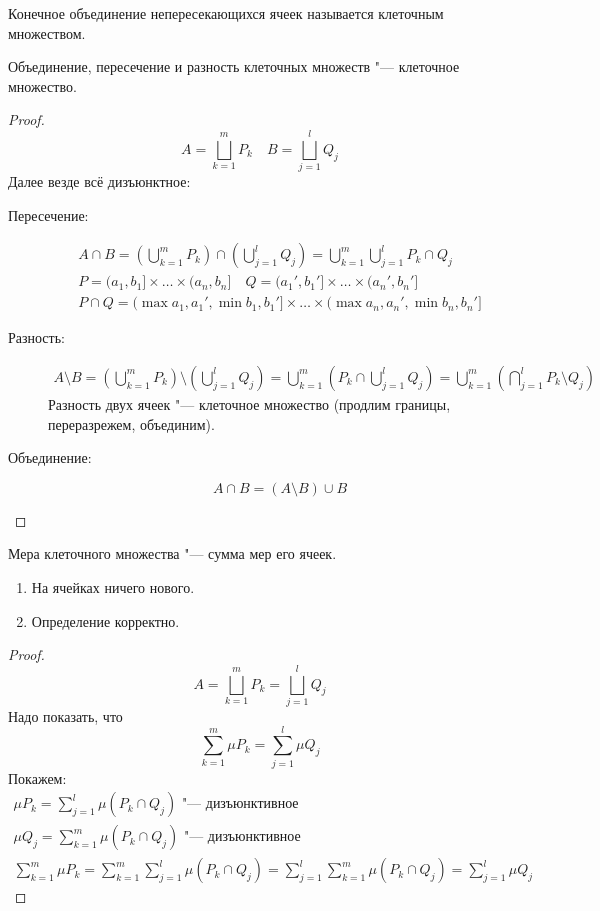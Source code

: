 \begin{Def}
	Конечное объединение непересекающихся ячеек называется клеточным множеством.
\end{Def}
\begin{lemma}
	Объединение, пересечение и разность клеточных множеств "--- клеточное множество.
\end{lemma}
\begin{proof}
	\[ A = \bigsqcup_{k=1}^m P_k \quad B = \bigsqcup_{j=1}^l Q_j \]
	Далее везде всё дизъюнктное:
	\begin{description}
	\item[Пересечение:]
		\begin{gather*}
			A \cap B = \left(\bigcup_{k=1}^m P_k\right) \cap \left(\bigcup_{j=1}^l Q_j\right)
				= \bigcup_{k=1}^m \bigcup_{j=1}^l P_k \cap Q_j \\
			P = (a_1, b_1] \times \dots \times (a_n, b_n] \quad Q = (a_1', b_1'] \times \dots \times (a_n', b_n'] \\
			P \cap Q = (\max{a_1, a_1'}, \min{b_1, b_1'}] \times \dots \times (\max{a_n, a_n'}, \min{b_n, b_n'}]
		\end{gather*}

	\item[Разность:]
		\begin{gather*}
			A \setminus B = \left(\bigcup_{k=1}^m P_k\right) \setminus \left(\bigcup_{j=1}^l Q_j\right)
				= \bigcup_{k=1}^m \left( P_k \cap \bigcup_{j=1}^l Q_j \right) = \bigcup_{k=1}^m \left( \bigcap_{j=1}^l P_k \setminus Q_j \right)
		\end{gather*}
		Разность двух ячеек "--- клеточное множество (продлим границы, переразрежем, объединим).

	\item[Объединение:]
		\[ A \cap B = (A \setminus B) \cup B \]
	\end{description}
\end{proof}

\begin{Def}
	Мера клеточного множества "--- сумма мер его ячеек.
\end{Def}
\begin{assertion}
	\begin{enumerate}
		\item На ячейках ничего нового.
		\item Определение корректно.
	\end{enumerate}
\end{assertion}
\begin{proof}
	\[ A = \bigsqcup_{k=1}^m P_k = \bigsqcup_{j=1}^l Q_j \]
	Надо показать, что
	\[ \sum_{k=1}^m \mu P_k = \sum_{j=1}^l \mu Q_j \]
	Покажем:
	\begin{gather*}
		\mu P_k = \sum_{j=1}^l \mu (P_k \cap Q_j) \text{ "--- дизъюнктивное} \\
		\mu Q_j = \sum_{k=1}^m \mu (P_k \cap Q_j) \text{ "--- дизъюнктивное} \\
		\sum_{k=1}^m \mu P_k = \sum_{k=1}^m \sum_{j=1}^l \mu (P_k \cap Q_j)
			= \sum_{j=1}^l \sum_{k=1}^m \mu (P_k \cap Q_j) = \sum_{j=1}^l \mu Q_j
	\end{gather*}
\end{proof}